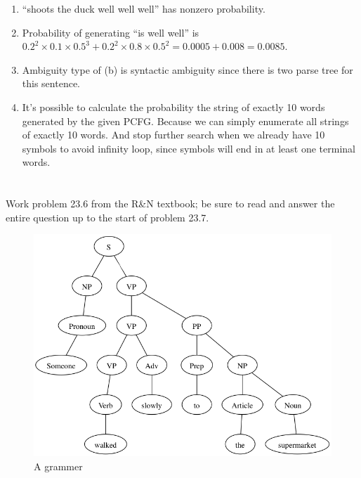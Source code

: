 \documentclass[paper=a4, fontsize=11pt]{scrartcl} %
\begin{document}
\begin{enumerate}
\item ``shoots the duck well well well'' has nonzero probability.
\item Probability of generating ``is well well'' is
  $0.2^{2}\times 0.1\times 0.5^{3} + 0.2^{2}\times 0.8\times 0.5^{2}
  = 0.0005 + 0.008 = 0.0085$.
\item Ambiguity type of (b) is
  syntactic ambiguity since there is two parse tree for this sentence.
\item
  It's possible to calculate the probability the string of exactly
  10 words generated by the given PCFG.
  Because we can simply enumerate all strings of exactly 10 words.
  And stop further search when we already have 10 symbols to avoid
  infinity loop, since symbols will end in at least one terminal
  words.
\end{enumerate}

\section{}

\begin{fancyquotes}
  Work problem 23.6 from the R\&N textbook; be sure to read and answer
  the entire question up to the start of problem 23.7.
\end{fancyquotes}

\begin{figure}[hp]
  \centering
  \includegraphics[width=.7\textwidth]{4-8.gv.png}
  \caption{A grammer}
\end{figure}
\end{document}
